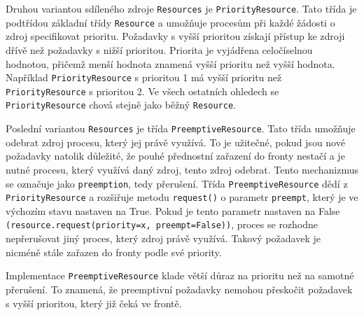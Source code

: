 \documentclass[12pt,a4paper]{article}
\begin{document}
Druhou variantou sdíleného zdroje \texttt{Resources} je \texttt{PriorityResource}. Tato třída je podtřídou základní třídy \texttt{Resource} a umožňuje procesům při každé žádosti o zdroj specifikovat prioritu. Požadavky s vyšší prioritou získají přístup ke zdroji dřívě než požadavky s nižší prioritou. Priorita je vyjádřena celočíselnou hodnotou, přičemž menší hodnota znamená vyšší prioritu než vyšší hodnota. Například \texttt{PriorityResource} s prioritou 1 má vyšší prioritu než \texttt{PriorityResource} s prioritou 2. Ve všech ostatních ohledech se \texttt{PriorityResource} chová stejně jako běžný \texttt{Resource}.

Poslední variantou \texttt{Resources} je třída \texttt{PreemptiveResource}. Tato třída umožňuje odebrat zdroj procesu, který jej právě využívá. To je užitečné, pokud jsou nové požadavky natolik důležité, že pouhé přednostní zařazení do fronty nestačí a je nutné procesu, který využívá daný zdroj, tento zdroj odebrat. Tento mechanizmus se označuje jako \texttt{preemption}, tedy přerušení. Třída \texttt{PreemptiveResource} dědí z \texttt{PriorityResource} a rozšiřuje metodu \texttt{request()} o parametr \texttt{preempt}, který je ve výchozím stavu nastaven na True. Pokud je tento parametr nastaven na False \texttt{(resource.request(priority=x, preempt=False))}, proces se rozhodne nepřerušovat jiný proces, který zdroj právě využívá. Takový požadavek je nicméně stále zařazen do fronty podle své priority.

Implementace \texttt{PreemptiveResource} klade větší důraz na prioritu než na samotné přerušení. To znamená, že preemptivní požadavky nemohou přeskočit požadavek s vyšší prioritou, který již čeká ve frontě. 
\end{document}
